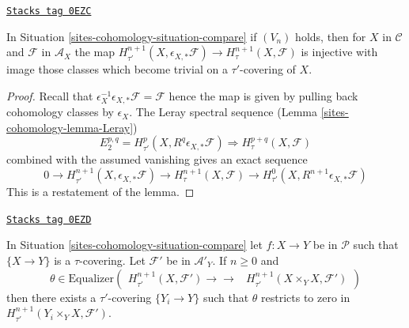 \begin{lemma}
\label{sites-cohomology-lemma-V-implies-cohomology-extra-general}
\href{https://stacks.math.columbia.edu/tag/0EZC}{\texttt{Stacks tag 0EZC}}

In Situation \ref{sites-cohomology-situation-compare} if $(V_n)$ holds, then for
$X$ in $\mathcal{C}$ and $\mathcal{F}$ in $\mathcal{A}_X$ the map
$H^{n + 1}_{\tau'}(X, \epsilon_{X, *}\mathcal{F}) \to
H^{n + 1}_\tau(X, \mathcal{F})$
is injective with image those classes which become trivial on
a $\tau'$-covering of $X$.
\end{lemma}

\begin{proof}
Recall that $\epsilon_X^{-1}\epsilon_{X, *}\mathcal{F} = \mathcal{F}$
hence the map is given by pulling back cohomology classes
by $\epsilon_X$. The Leray spectral sequence (Lemma \ref{sites-cohomology-lemma-Leray})
$$
E_2^{p, q} = H^p_{\tau'}(X, R^q\epsilon_{X, *}\mathcal{F})
\Rightarrow
H^{p + q}_\tau(X, \mathcal{F})
$$
combined with the assumed vanishing gives an exact sequence
$$
0 \to
H^{n + 1}_{\tau'}(X, \epsilon_{X, *}\mathcal{F}) \to
H^{n + 1}_\tau(X, \mathcal{F}) \to
H^0_{\tau'}(X, R^{n + 1}\epsilon_{X, *}\mathcal{F})
$$
This is a restatement of the lemma.
\end{proof}

\begin{lemma}
\label{sites-cohomology-lemma-make-class-zero-general}
\href{https://stacks.math.columbia.edu/tag/0EZD}{\texttt{Stacks tag 0EZD}}

In Situation \ref{sites-cohomology-situation-compare} let $f : X \to Y$
be in $\mathcal{P}$ such that $\{X \to Y\}$ is a $\tau$-covering.
Let $\mathcal{F}'$ be in $\mathcal{A}'_Y$. If $n \geq 0$ and
$$
\theta \in
\text{Equalizer}\left(
\begin{array}{cc}H^{n + 1}_{\tau'}(X, \mathcal{F}')
\longrightarrow\longrightarrow & H^{n + 1}_{\tau'}(X \times_Y X, \mathcal{F}')\end{array}
\right)
$$
then there exists a $\tau'$-covering $\{Y_i \to Y\}$
such that $\theta$ restricts to zero in
$H^{n + 1}_{\tau'}(Y_i \times_Y X, \mathcal{F}')$.
\end{lemma}


